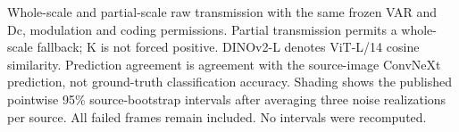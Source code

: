 Whole-scale and partial-scale raw transmission with the same frozen VAR and Dc, modulation and coding permissions. Partial transmission permits a whole-scale fallback; K is not forced positive. DINOv2-L denotes ViT-L/14 cosine similarity. Prediction agreement is agreement with the source-image ConvNeXt prediction, not ground-truth classification accuracy. Shading shows the published pointwise 95\% source-bootstrap intervals after averaging three noise realizations per source. All failed frames remain included. No intervals were recomputed.
